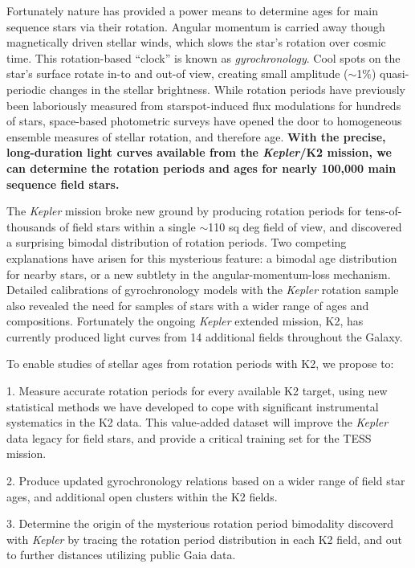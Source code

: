 \documentclass[12pt]{article}
\newcommand{\Kepler}{\textsl{Kepler}\xspace}
\begin{document}
Fortunately nature has provided a power means to determine ages for main sequence stars via their rotation. Angular momentum is carried away though magnetically driven stellar winds, which slows the star's rotation over cosmic time. This rotation-based ``clock'' is known as {\it gyrochronology}. Cool spots on the star's surface rotate in-to and out-of view, creating small amplitude ($\sim$1\%) quasi-periodic changes in the stellar brightness. While rotation periods have previously been laboriously measured from starspot-induced flux modulations for hundreds of stars, space-based photometric surveys have opened the door to homogeneous ensemble measures of stellar rotation, and therefore age.
{\bf With the precise, long-duration light curves available from the \Kepler/K2 mission, we can determine the rotation periods and ages for nearly 100,000 main sequence field stars.}

The \Kepler mission broke new ground by producing rotation periods for tens-of-thousands of field stars within a single $\sim$110 sq deg field of view, and discovered a surprising bimodal distribution of rotation periods. Two competing explanations have arisen for this mysterious feature: a bimodal age distribution for nearby stars, or a new subtlety in the angular-momentum-loss mechanism. Detailed calibrations of gyrochronology models with the \Kepler rotation sample also revealed the need for samples of stars with a wider range of ages and compositions. Fortunately the ongoing \Kepler extended mission, K2, has currently produced light curves from 14 additional fields throughout the Galaxy.

To enable studies of stellar ages from rotation periods with K2, we propose to:

1. Measure accurate rotation periods for every available K2 target, using new statistical methods we have developed to cope with significant instrumental systematics in the K2 data. This value-added dataset will improve the \Kepler data legacy for field stars, and provide a critical training set for the TESS mission. 

2. Produce updated gyrochronology relations based on a wider range of field star ages, and additional open clusters within the K2 fields.

3. Determine the origin of the mysterious rotation period bimodality discoverd with \Kepler by tracing the rotation period distribution in each K2 field, and out to further distances utilizing public Gaia data.
\end{document}
